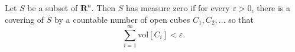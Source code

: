 Let $S$ be a subset of $\mathbf{R}^n$. Then $S$ has measure zero if for every $\varepsilon > 0$, there is a covering of $S$ by a countable number of open cubes $C_1, C_2, \ldots$ so that
$$\sum_{i=1}^{\infty} \text{vol} [C_i] < \varepsilon.$$
